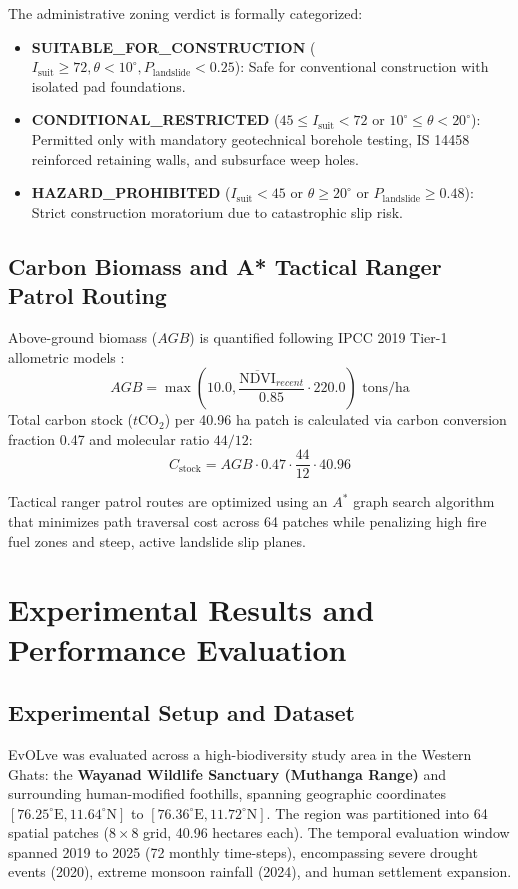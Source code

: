 \documentclass[conference]{IEEEtran}
\begin{document}
The administrative zoning verdict is formally categorized:
\begin{itemize}
    \item \textbf{SUITABLE\_FOR\_CONSTRUCTION} ($I_{\text{suit}} \ge 72, \theta < 10^\circ, P_{\text{landslide}} < 0.25$): Safe for conventional construction with isolated pad foundations.
    \item \textbf{CONDITIONAL\_RESTRICTED} ($45 \le I_{\text{suit}} < 72$ or $10^\circ \le \theta < 20^\circ$): Permitted only with mandatory geotechnical borehole testing, IS 14458 reinforced retaining walls, and subsurface weep holes.
    \item \textbf{HAZARD\_PROHIBITED} ($I_{\text{suit}} < 45$ or $\theta \ge 20^\circ$ or $P_{\text{landslide}} \ge 0.48$): Strict construction moratorium due to catastrophic slip risk.
\end{itemize}

\subsection{Carbon Biomass and A* Tactical Ranger Patrol Routing}
Above-ground biomass ($AGB$) is quantified following IPCC 2019 Tier-1 allometric models \cite{chave2014improved}:
\begin{equation}
AGB = \max\left(10.0, \frac{\overline{\text{NDVI}}_{recent}}{0.85} \cdot 220.0\right) \text{ tons/ha}
\end{equation}
Total carbon stock ($t\text{CO}_2$) per 40.96 ha patch is calculated via carbon conversion fraction 0.47 and molecular ratio $44/12$:
\begin{equation}
C_{\text{stock}} = AGB \cdot 0.47 \cdot \frac{44}{12} \cdot 40.96
\end{equation}

Tactical ranger patrol routes are optimized using an $A^*$ graph search algorithm that minimizes path traversal cost across 64 patches while penalizing high fire fuel zones and steep, active landslide slip planes.

\section{Experimental Results and Performance Evaluation}

\subsection{Experimental Setup and Dataset}
EvOLve was evaluated across a high-biodiversity study area in the Western Ghats: the \textbf{Wayanad Wildlife Sanctuary (Muthanga Range)} and surrounding human-modified foothills, spanning geographic coordinates $[76.25^\circ\text{E}, 11.64^\circ\text{N}]$ to $[76.36^\circ\text{E}, 11.72^\circ\text{N}]$. The region was partitioned into 64 spatial patches ($8 \times 8$ grid, 40.96 hectares each). The temporal evaluation window spanned 2019 to 2025 (72 monthly time-steps), encompassing severe drought events (2020), extreme monsoon rainfall (2024), and human settlement expansion.
\end{document}
